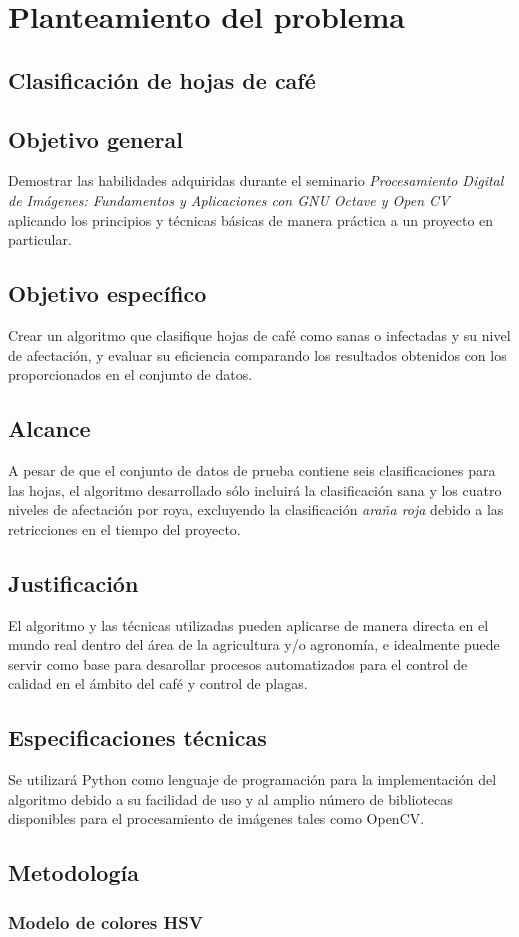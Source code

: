 \chapter{Planteamiento del problema}

\section{Clasificación de hojas de café}

\section{Objetivo general}
Demostrar las habilidades adquiridas durante el seminario \textit{Procesamiento Digital de Imágenes: Fundamentos y Aplicaciones con GNU Octave y Open CV} aplicando los principios y técnicas básicas de manera práctica a un proyecto en particular.

\section{Objetivo específico}
Crear un algoritmo que clasifique hojas de café como sanas o infectadas y su nivel de afectación, y evaluar su eficiencia comparando los resultados obtenidos con los proporcionados en el conjunto de datos.

\section{Alcance}
A pesar de que el conjunto de datos de prueba contiene seis clasificaciones para las hojas, el algoritmo desarrollado sólo incluirá la clasificación sana y los cuatro niveles de afectación por roya, excluyendo la clasificación \textit{araña roja} debido a las retricciones en el tiempo del proyecto.

\section{Justificación}
El algoritmo y las técnicas utilizadas pueden aplicarse de manera directa en el mundo real dentro del área de la agricultura y/o agronomía, e idealmente puede servir como base para desarollar procesos automatizados para el control de calidad en el ámbito del café y control de plagas.
 
\section{Especificaciones técnicas}
Se utilizará Python como lenguaje de programación para la implementación del algoritmo debido a su facilidad de uso y al amplio número de bibliotecas disponibles para el procesamiento de imágenes tales como OpenCV.

\section{Metodología}

\subsection{Modelo de colores HSV}